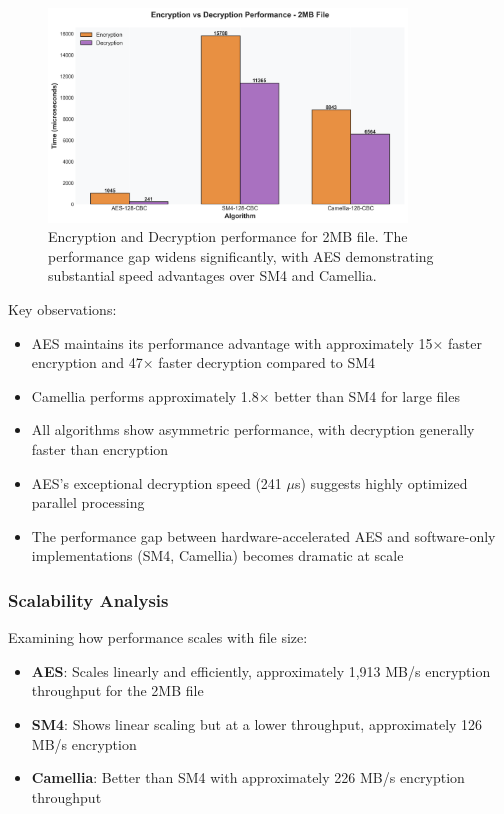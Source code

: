 \documentclass[12pt,a4paper]{article}
\begin{document}
\begin{figure}[h]
\centering
\includegraphics[width=0.85\textwidth]{performance_2MB.png}
\caption{Encryption and Decryption performance for 2MB file. The performance gap widens significantly, with AES demonstrating substantial speed advantages over SM4 and Camellia.}
\label{fig:perf_2mb}
\end{figure}

Key observations:
\begin{itemize}
    \item AES maintains its performance advantage with approximately 15× faster encryption and 47× faster decryption compared to SM4
    \item Camellia performs approximately 1.8× better than SM4 for large files
    \item All algorithms show asymmetric performance, with decryption generally faster than encryption
    \item AES's exceptional decryption speed (241 $\mu$s) suggests highly optimized parallel processing
    \item The performance gap between hardware-accelerated AES and software-only implementations (SM4, Camellia) becomes dramatic at scale
\end{itemize}

\subsubsection{Scalability Analysis}
Examining how performance scales with file size:
\begin{itemize}
    \item \textbf{AES}: Scales linearly and efficiently, approximately 1,913 MB/s encryption throughput for the 2MB file
    \item \textbf{SM4}: Shows linear scaling but at a lower throughput, approximately 126 MB/s encryption
    \item \textbf{Camellia}: Better than SM4 with approximately 226 MB/s encryption throughput
\end{itemize}
\end{document}
